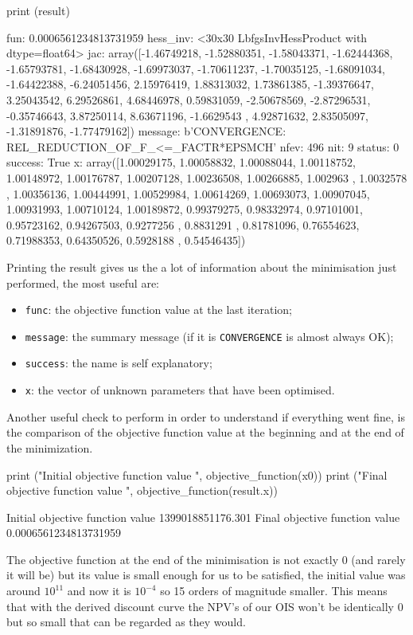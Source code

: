 \begin{itemize}
\begin{ipython}
print (result)
\end{ipython}
\begin{ioutput}
      fun: 0.0006561234813731959
 hess_inv: <30x30 LbfgsInvHessProduct with dtype=float64>
      jac: array([-1.46749218, -1.52880351, -1.58043371, -1.62444368,
                  -1.65793781, -1.68430928, -1.69973037, -1.70611237, 
                  -1.70035125, -1.68091034, -1.64422388, -6.24051456,  
                   2.15976419,  1.88313032,  1.73861385, -1.39376647,  
                   3.25043542,  6.29526861,  4.68446978,  0.59831059,
                  -2.50678569, -2.87296531, -0.35746643,  3.87250114,  
                   8.63671196, -1.6629543 ,  4.92871632,  2.83505097, 
                  -1.31891876, -1.77479162])
  message: b'CONVERGENCE: REL_REDUCTION_OF_F_<=_FACTR*EPSMCH'
     nfev: 496
      nit: 9
   status: 0
  success: True
  x: array([1.00029175, 1.00058832, 1.00088044, 1.00118752,
  1.00148972, 1.00176787, 1.00207128, 1.00236508, 1.00266885,
  1.002963  , 1.0032578 , 1.00356136, 1.00444991, 1.00529984,
  1.00614269, 1.00693073, 1.00907045, 1.00931993, 1.00710124,
  1.00189872, 0.99379275, 0.98332974, 0.97101001, 0.95723162,
  0.94267503, 0.9277256 , 0.8831291 , 0.81781096, 0.76554623,
  0.71988353, 0.64350526, 0.5928188 , 0.54546435])
\end{ioutput}
\end{itemize}

Printing the result gives us the a lot of information about the minimisation just performed, the most useful are:
\begin{itemize}
\item \texttt{func}: the objective function value at the last iteration;
\item \texttt{message}: the summary message (if it is \texttt{CONVERGENCE} is almost always OK);
\item \texttt{success}: the name is self explanatory;
\item \texttt{x}: the vector of unknown parameters that have been optimised.
\end{itemize}

Another useful check to perform in order to understand if everything went fine, is the comparison of the objective function value at the beginning and at the end of the minimization.

\begin{ipython}
print ("Initial objective function value ", objective_function(x0))
print ("Final objective function value ", objective_function(result.x))
\end{ipython}
\begin{ioutput}
Initial objective function value  1399018851176.301
Final objective function value  0.0006561234813731959
\end{ioutput}
The objective function at the end of the minimisation is not exactly 0 (and rarely it will be) but its value is small enough for us to be satisfied, the initial value was around $10^{11}$ and now it is $10^{-4}$ so 15 orders of magnitude smaller. This means that with the derived discount curve the NPV's of our OIS won't be identically 0 but so small that can be regarded as they would.

